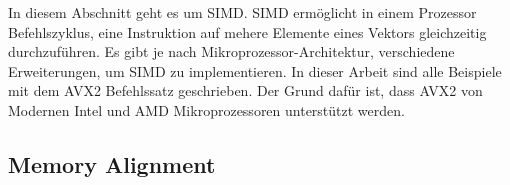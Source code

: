 In diesem Abschnitt geht es um \ac{SIMD}. \ac{SIMD} ermöglicht in einem Prozessor Befehlszyklus, eine Instruktion auf mehere Elemente eines Vektors gleichzeitig durchzuführen. Es gibt je nach Mikroprozessor-Architektur, verschiedene Erweiterungen, um \ac{SIMD} zu implementieren. In dieser Arbeit sind alle Beispiele mit dem \ac{AVX2} Befehlssatz geschrieben. Der Grund dafür ist, dass \ac{AVX2} von Modernen Intel und AMD Mikroprozessoren unterstützt werden.


\subsection{Memory Alignment}

